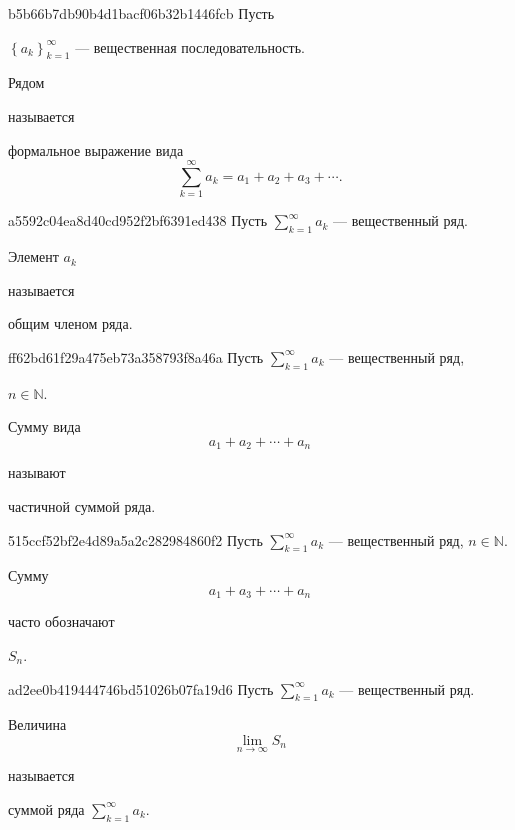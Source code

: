 \begin{note}{b5b66b7db90b4d1bacf06b32b1446fcb}
    Пусть \begin{icloze}{3}\({ \left\{ a_k \right\}_{k=1}^{\infty} }\) --- вещественная последовательность.\end{icloze}
    \begin{icloze}{2}Рядом\end{icloze} называется
    \begin{icloze}{1}
        формальное выражение вида
        \[
            \sum_{k=1}^{\infty} a_k = a_1 + a_2 + a_3 + \cdots.
        \]
    \end{icloze}
\end{note}

\begin{note}{a5592c04ea8d40cd952f2bf6391ed438}
    Пусть \({ \sum_{k=1}^{\infty} a_k }\) --- вещественный ряд.
    \begin{icloze}{2}Элемент \({ a_k }\)\end{icloze} называется \begin{icloze}{1}общим членом ряда.\end{icloze}
\end{note}

\begin{note}{ff62bd61f29a475eb73a358793f8a46a}
    Пусть \({ \sum_{k=1}^{\infty} a_k }\) --- вещественный ряд, \begin{icloze}{3}\({ n \in \mathbb N }\).\end{icloze}
    \begin{icloze}{2}
        Сумму вида
        \[
            a_1 + a_2 + \cdots + a_n
        \]
    \end{icloze}
    называют \begin{icloze}{1}частичной суммой ряда.\end{icloze}
\end{note}

\begin{note}{515ccf52bf2e4d89a5a2c282984860f2}
    Пусть \({ \sum_{k=1}^{\infty} a_k }\) --- вещественный ряд, \({ n \in \mathbb N }\).
    \begin{icloze}{1}
        Сумму
        \[
            a_1 + a_3 + \cdots + a_n
        \]
    \end{icloze}
    часто обозначают \begin{icloze}{2}\({ S_n }\).\end{icloze}
\end{note}

\begin{note}{ad2ee0b419444746bd51026b07fa19d6}
    Пусть \({ \sum_{k=1}^{\infty} a_k }\) --- вещественный ряд.
    \begin{icloze}{1}
        Величина
        \[
            \lim_{n \to \infty} S_n
        \]
    \end{icloze}
    называется \begin{icloze}{2}суммой ряда \({ \sum_{k=1}^{\infty} a_k }\).\end{icloze}
\end{note}

